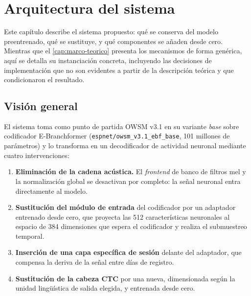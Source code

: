 %

\chapter{Arquitectura del sistema}
\label{cap:arquitectura}

Este capítulo describe el sistema propuesto: qué se conserva del modelo preentrenado, qué se sustituye, y qué componentes se añaden desde cero. Mientras que el \cref{cap:marco-teorico} presenta los mecanismos de forma genérica, aquí se detalla su instanciación concreta, incluyendo las decisiones de implementación que no son evidentes a partir de la descripción teórica y que condicionaron el resultado.

\section{Visión general}
\label{sec:vision-general}

El sistema toma como punto de partida OWSM v3.1 en su variante \textit{base} sobre codificador E-Branchformer (\texttt{espnet/owsm\_v3.1\_ebf\_base}, 101 millones de parámetros) y lo transforma en un decodificador de actividad neuronal mediante cuatro intervenciones:

\begin{enumerate}[leftmargin=*, itemsep=0.3em]
  \item \textbf{Eliminación de la cadena acústica.} El \textit{frontend} de banco de filtros mel y la normalización global se desactivan por completo: la señal neuronal entra directamente al modelo.
  \item \textbf{Sustitución del módulo de entrada} del codificador por un adaptador entrenado desde cero, que proyecta las 512 características neuronales al espacio de 384 dimensiones que espera el codificador y realiza el submuestreo temporal.
  \item \textbf{Inserción de una capa específica de sesión} delante del adaptador, que compensa la deriva de la señal entre días de registro.
  \item \textbf{Sustitución de la cabeza CTC} por una nueva, dimensionada según la unidad lingüística de salida elegida, y entrenada desde cero.
\end{enumerate}

